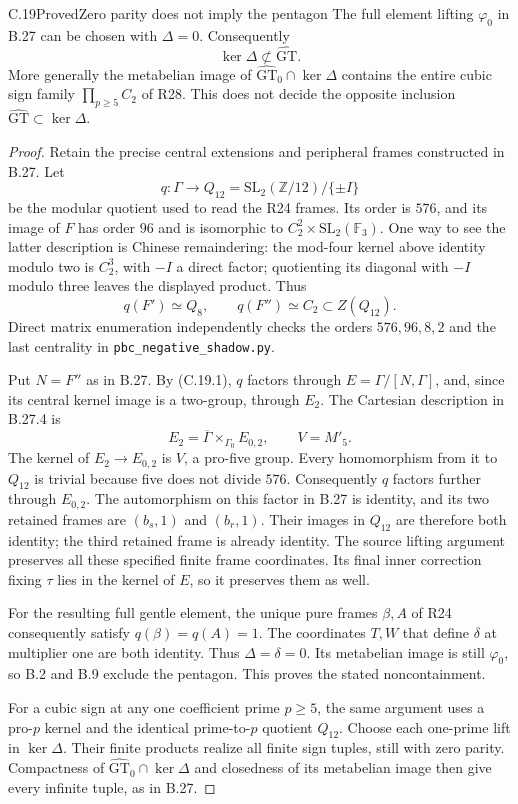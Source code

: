 \begin{statement}{C.19}{Proved}{Zero parity does not imply the pentagon}
The full element lifting $\varphi_0$ in B.27 can be chosen
with $\Delta=0$. Consequently
\[
       \ker\Delta\not\subset\widehat{\mathrm{GT}}.
\]
More generally the metabelian image of
$\widehat{\mathrm{GT}}_0\cap\ker\Delta$ contains the
entire cubic sign family $\prod_{p\geq5}C_2$ of R28.
This does not decide the opposite inclusion
$\widehat{\mathrm{GT}}\subset\ker\Delta$.
\end{statement}
\begin{proof}
Retain the precise central extensions and peripheral
frames constructed in B.27. Let
\[
 q:\Gamma\longrightarrow
 Q_{12}=\mathrm{SL}_2(\mathbb Z/12)/\{\pm I\}
\]
be the modular quotient used to read the R24 frames.
Its order is $576$, and its image of $F$ has order
$96$ and is isomorphic to
$C_2^2\times\mathrm{SL}_2(\mathbb F_3)$.
One way to see the latter description is Chinese
remaindering: the mod-four kernel above identity
modulo two is $C_2^3$, with $-I$ a direct factor;
quotienting its diagonal with $-I$ modulo three
leaves the displayed product. Thus
\[
             q(F')\simeq Q_8,\qquad
             q(F'')\simeq C_2\subset Z(Q_{12}).
 \tag{C.19.1}
\]
Direct matrix enumeration independently checks the
orders $576,96,8,2$ and the last centrality in
\texttt{pbc\_negative\_shadow.py}.

Put $N=F''$ as in B.27. By (C.19.1), $q$ factors
through $E=\Gamma/[N,\Gamma]$, and, since its
central kernel image is a two-group, through $E_2$.
The Cartesian description in B.27.4 is
\[
 E_2=\overline\Gamma\mathbin\times_{\Gamma_0}E_{0,2},
 \qquad V=M'_5.
\]
The kernel of $E_2\to E_{0,2}$ is $V$, a pro-five
group. Every homomorphism from it to $Q_{12}$ is
trivial because five does not divide $576$.
Consequently $q$ factors further through $E_{0,2}$.
The automorphism on this factor in B.27 is identity,
and its two retained frames are $(b_s,1)$ and
$(b_r,1)$. Their images in $Q_{12}$ are therefore
both identity; the third retained frame is already
identity. The source lifting argument preserves all
these specified finite frame coordinates. Its final
inner correction fixing $\tau$ lies in the kernel
of $E$, so it preserves them as well.

For the resulting full gentle element, the unique
pure frames $\beta,A$ of R24 consequently satisfy
$q(\beta)=q(A)=1$. The coordinates $T,W$ that define
$\delta$ at multiplier one are both identity.
Thus $\Delta=\delta=0$. Its metabelian image is
still $\varphi_0$, so B.2 and B.9 exclude the
pentagon. This proves the stated noncontainment.

For a cubic sign at any one coefficient prime
$p\geq5$, the same argument uses a pro-$p$ kernel
and the identical prime-to-$p$ quotient $Q_{12}$.
Choose each one-prime lift in $\ker\Delta$.
Their finite products realize all finite sign
tuples, still with zero parity. Compactness of
$\widehat{\mathrm{GT}}_0\cap\ker\Delta$ and
closedness of its metabelian image then give
every infinite tuple, as in B.27.
\end{proof}

